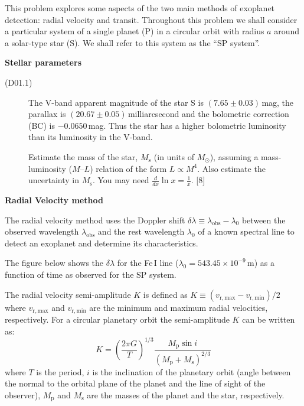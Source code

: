 This problem explores some aspects of the two main methods of exoplanet
detection: radial velocity and transit. Throughout this problem we shall
consider a particular system of a single planet (P) in a circular orbit with
radius $a$ around a solar-type star (S). We shall refer to this system as the
``SP system''.

\medskip\noindent\textbf{Stellar parameters}

\begin{description}
\item[(D01.1)] The V-band apparent magnitude of the star S is
  $(7.65\pm0.03)$\,mag, the parallax is $(20.67\pm0.05)$\,milliarcsecond and
  the bolometric correction (BC) is $-0.0650$\,mag. Thus the star has a higher
  bolometric luminosity than its luminosity in the V-band.

  Estimate the mass of the star, $M_{\mathrm{s}}$ (in units of $M_\odot$),
  assuming a mass-luminosity ($M$--$L$) relation of the form $L \propto M^4$.
  Also estimate the uncertainty in $M_{\mathrm{s}}$. You may need
  $\frac{d}{dx}\ln x = \frac{1}{x}$. \hfill[8]
\end{description}

\medskip\noindent\textbf{Radial Velocity method}

The radial velocity method uses the Doppler shift
$\delta\lambda \equiv \lambda_{\mathrm{obs}} - \lambda_0$ between the observed
wavelength $\lambda_{\mathrm{obs}}$ and the rest wavelength $\lambda_0$ of a
known spectral line to detect an exoplanet and determine its characteristics.

The figure below shows the $\delta\lambda$ for the Fe\,I line
($\lambda_0 = 543.45\times10^{-9}$\,m) as a function of time as observed for
the SP system.


The radial velocity semi-amplitude $K$ is defined as
$K \equiv (v_{\mathrm{r,max}} - v_{\mathrm{r,min}})/2$ where
$v_{\mathrm{r,max}}$ and $v_{\mathrm{r,min}}$ are the minimum and maximum
radial velocities, respectively.
For a circular planetary orbit the semi-amplitude $K$ can be written as:
\[
K = \left(\frac{2\pi G}{T}\right)^{1/3}
    \frac{M_{\mathrm{p}}\sin i}{(M_{\mathrm{p}} + M_{\mathrm{s}})^{2/3}}
\]
where $T$ is the period, $i$ is the inclination of the planetary orbit (angle
between the normal to the orbital plane of the planet and the line of sight of
the observer), $M_{\mathrm{p}}$ and $M_{\mathrm{s}}$ are the masses of the
planet and the star, respectively.

